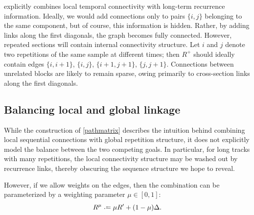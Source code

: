 \documentclass{article}
\begin{document}
 explicitly combines local temporal connectivity with long-term
recurrence information.  Ideally, we would add connections only to pairs $\{i,j\}$
belonging to the same component, but of course, this information is hidden.  Rather,
by adding links along the first diagonals, the graph becomes fully connected.  
However, repeated sections will contain internal connectivity structure.  Let $i$ and
$j$ denote two repetitions of the same sample at different times; then $R^+$ should
ideally contain edges $\{i, i+1\}$, $\{i, j\}$, $\{i+1, j+1\}$, $\{j, j+1\}$.
Connections between unrelated blocks are likely to remain sparse, owing primarily to
cross-section links along the first diagonals.  


\subsection{Balancing local and global linkage}
While the construction of \cref{pathmatrix} describes the intuition behind combining
local sequential connections with global repetition structure, it does not explicitly
model the balance between the two competing goals.  In particular, for long tracks
with many repetitions, the local connectivity structure may be washed out by
recurrence links, thereby obscuring the sequence structure we hope to reveal.

However, if we allow weights on the edges, then the combination can be parameterized 
by a weighting parameter $\mu \in [0, 1]$:
\begin{equation}
R^\mu \defeq \mu R' + (1 - \mu) \Delta. \label{weightedsum}
\end{equation}
\end{document}
